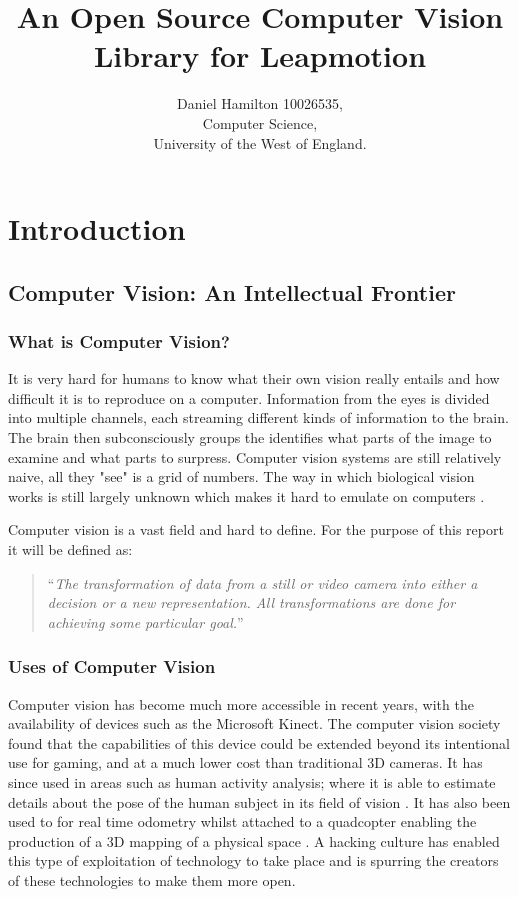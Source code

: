 \documentclass[12pt,a4paper]{report}
\title{An Open Source Computer Vision Library for Leapmotion}
\author{Daniel Hamilton 10026535,\\Computer Science,\\University of the West of England.}
\begin{document}
	\maketitle
	\tableofcontents
	\begin{abstract}
	
	\end{abstract}	
	
	\chapter{Introduction}
		\section{Computer Vision: An Intellectual Frontier}
			\subsection{What is Computer Vision?}		
				
It is very hard for humans to know what their own vision really entails and how difficult it is to reproduce on a computer.
Information from the eyes is divided into multiple channels, each streaming different kinds of information to the brain.
The brain then subconsciously groups the identifies what parts of the image to examine and what parts to surpress.
Computer vision systems are still relatively naive, all they "see" is a grid of numbers.
The way in which biological vision works is still largely unknown which makes it hard to emulate on computers \cite{cvMultipleViewGeometry}.
				
Computer vision is a vast field and hard to define.
For the purpose of this report it will be defined as:
	
				\begin{quote}
``\textit{The transformation of data from a still or video camera into either a decision or a new representation.
All transformations are done for achieving some particular goal.}'' \cite{cvDef}
				\end{quote}

			\subsection{Uses of Computer Vision}
Computer vision has become much more accessible in recent years, with the availability of devices such as the Microsoft Kinect.
The computer vision society found that the capabilities of this device could be extended beyond its intentional use for gaming, and at a much lower cost than traditional 3D cameras.
It has since used in areas such as human activity analysis; where it is able to estimate details about the pose of the human subject in its field of vision \cite{kinect:1}.
It has also been used to for real time odometry whilst attached to a quadcopter enabling the production of a 3D mapping of a physical space \cite{kinect:2}.
A hacking culture has enabled this type of exploitation of technology to take place and is spurring the creators of these technologies to make them more open.
		
\end{document}
